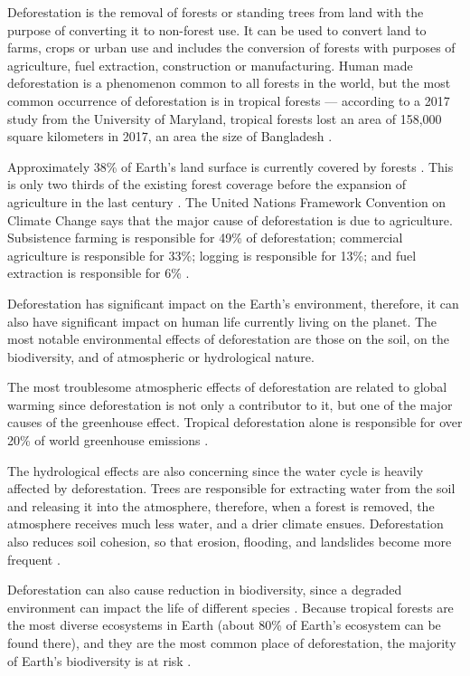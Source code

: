 Deforestation is the removal of forests or standing trees from land
with the purpose of converting it to non-forest use. It can be used to convert land to farms,
crops or urban use and includes the conversion of forests with purposes of agriculture, fuel extraction,
construction or manufacturing. Human made deforestation is a phenomenon common to all forests in the world, but
the most common occurrence of deforestation is in tropical forests \cite{Alina} --- according to a 2017 study from the University of Maryland,
tropical forests lost an area of 158,000 square kilometers in 2017, an area the size of Bangladesh \cite{maryland}.

Approximately 38\% of Earth's land surface is currently covered by forests \cite{WWF}. This is only two thirds of the existing
forest coverage before the expansion of agriculture in the last century \cite{WID}. The United Nations Framework Convention on Climate Change
says that the major cause of deforestation is due to agriculture. Subsistence farming is responsible for 49\% of deforestation; commercial agriculture
is responsible for 33\%; logging is responsible for 13\%; and fuel extraction is responsible for 6\% \cite{UNFCCC}.

Deforestation has significant impact on the Earth's environment, therefore, it can also have significant impact on human life currently living on the planet.
The most notable environmental effects of deforestation are those on the soil, on the biodiversity, and of atmospheric or hydrological nature.

The most troublesome atmospheric effects of deforestation are related to global warming since deforestation is not only a contributor to it, but
one of the major causes of the greenhouse effect. Tropical deforestation alone is responsible for over 20\% of world greenhouse emissions \cite{Chirac}.

The hydrological effects are also concerning since the water cycle is heavily affected by deforestation. Trees are responsible for extracting water from the soil
and releasing it into the atmosphere, therefore, when a forest is removed, the atmosphere receives much less water, and a drier climate ensues. Deforestation also reduces soil cohesion,
so that erosion, flooding, and landslides become more frequent \cite{Rogge}.

Deforestation can also cause reduction in biodiversity, since a degraded environment can impact the life of different species \cite{umich}. Because
tropical forests are the most diverse ecosystems in Earth (about 80\% of Earth's ecosystem can be found there),
and they are the most common place of deforestation, the majority of Earth's biodiversity is at risk \cite{Mogato}.

